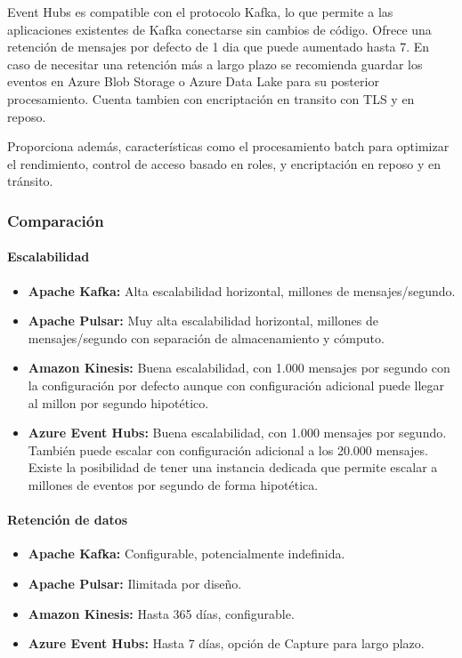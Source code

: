 Event Hubs es compatible con el protocolo Kafka, lo que permite a las aplicaciones existentes de Kafka conectarse sin cambios de código.
Ofrece una retención de mensajes por defecto de 1 dia que puede aumentado hasta 7. En caso de necesitar una retención más a largo plazo
se recomienda guardar los eventos en Azure Blob Storage o Azure Data Lake para su posterior procesamiento. 
Cuenta tambien con encriptación en transito con TLS y en reposo.

Proporciona además, características como el procesamiento batch para optimizar el rendimiento, 
control de acceso basado en roles, y encriptación en reposo y en tránsito. 

\subsubsection{Comparación}

\paragraph{Escalabilidad}
\begin{itemize}
    \item \textbf{Apache Kafka:} Alta escalabilidad horizontal, millones de mensajes/segundo.
    \item \textbf{Apache Pulsar:} Muy alta escalabilidad horizontal, millones de mensajes/segundo con separación de almacenamiento y cómputo.
    \item \textbf{Amazon Kinesis:} Buena escalabilidad, con 1.000 mensajes por segundo con la configuración por defecto aunque con configuración adicional puede llegar al millon por segundo hipotético.
    \item \textbf{Azure Event Hubs:} Buena escalabilidad, con 1.000 mensajes por segundo. También puede escalar con configuración adicional a los 20.000 mensajes. Existe la posibilidad de tener una instancia dedicada que permite escalar a millones de eventos por segundo de forma hipotética.
\end{itemize}

\paragraph{Retención de datos}
\begin{itemize}
    \item \textbf{Apache Kafka:} Configurable, potencialmente indefinida.
    \item \textbf{Apache Pulsar:} Ilimitada por diseño.
    \item \textbf{Amazon Kinesis:} Hasta 365 días, configurable.
    \item \textbf{Azure Event Hubs:} Hasta 7 días, opción de Capture para largo plazo.
\end{itemize}

